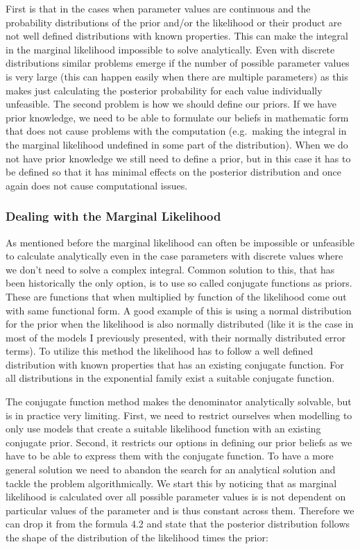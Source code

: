 \documentclass[12pt,a4paper,leqno]{report}
\theoremstyle{plain}
\theoremstyle{definition}
\theoremstyle{remark}
\begin{document}
First is that in the cases when parameter values are continuous
and the probability distributions of the prior and/or the likelihood or their
product are not well defined distributions with known properties. This can make
the integral in the marginal likelihood impossible to solve analytically.
Even with discrete distributions similar problems emerge if the number of
possible parameter values is very large (this can happen easily when there are multiple
parameters) as this makes just calculating the posterior probability for each value
individually unfeasible. The second problem is how we should define our priors.
If we have prior knowledge, we need to be able to formulate our beliefs in mathematic form that does not cause
problems with the computation (e.g.\ making the integral in the marginal likelihood
undefined in some part of the distribution). When we do not have prior knowledge
we still need to define a prior, but in this case it has to be defined
so that it has minimal effects on the posterior distribution and once
again does not cause computational issues.

\subsubsection{Dealing with the Marginal Likelihood}\label{bayesproblems}

As mentioned before the marginal likelihood can often be impossible or unfeasible to
calculate analytically even in the case parameters with discrete values where we don't
need to solve a complex integral.
Common solution to this, that has been historically the only option, is to use so called conjugate functions as priors. These are
functions that when multiplied by function of the likelihood come out
with same functional form. A good example of this is using a normal distribution
for the prior when the likelihood is also normally distributed (like it is the case in most
of the models I previously presented, with their normally distributed error terms).
To utilize this method the likelihood has to follow a well defined distribution
with known properties that has an existing conjugate function. For all distributions in
the exponential family exist a suitable conjugate function.

The conjugate function method makes the denominator analytically solvable, but is in practice very limiting.
First, we need to restrict ourselves when modelling to only use models that create a suitable likelihood function with an existing conjugate prior.
Second, it restricts our options in defining our prior beliefs as we have to be able to express them with the conjugate function.
To have a more general solution we need to abandon the search for an analytical
solution and tackle the problem algorithmically. We start this by noticing that as marginal likelihood
is calculated over all possible parameter values
is is not dependent on particular values of the parameter and is thus
constant across them. Therefore we can drop it from the formula 4.2 and state that the posterior
distribution follows the shape of the distribution of the likelihood times the prior:
\end{document}
